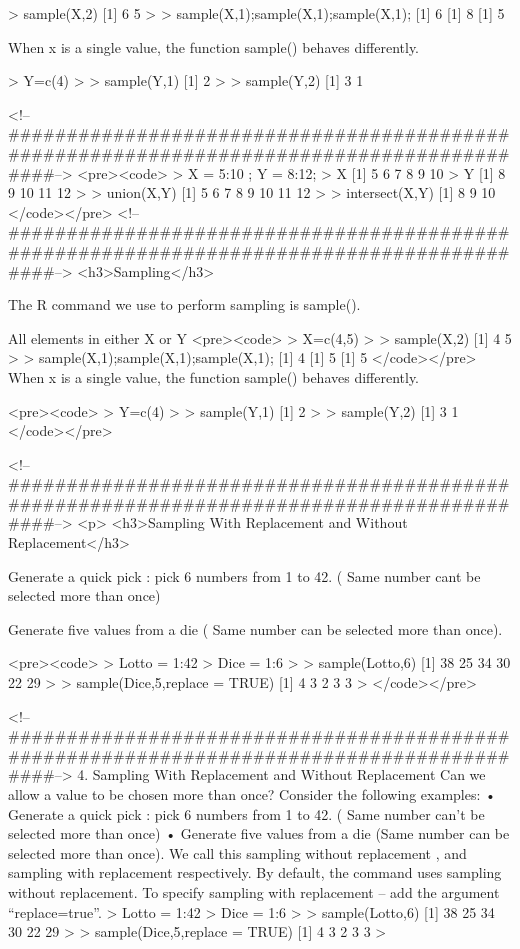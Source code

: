 > sample(X,2)
[1] 6 5
>
> sample(X,1);sample(X,1);sample(X,1);
[1] 6
[1] 8
[1] 5


When x is a single value, the function sample() behaves differently.

> Y=c(4)
>
> sample(Y,1)
[1] 2
> 
> sample(Y,2)
[1] 3 1







<!--##########################################################################################-->
<pre><code>
> X = 5:10 ; Y = 8:12;
> X
[1]  5  6  7  8  9 10
> Y
[1]  8  9 10 11 12
>
> union(X,Y)
[1]  5  6  7  8  9 10 11 12
>
> intersect(X,Y)
[1]  8  9 10
</code></pre>
<!--##########################################################################################-->
<h3>Sampling</h3>

The R command we use to perform sampling is sample().

All elements in either X or Y
<pre><code>
> X=c(4,5)
>
> sample(X,2)
[1] 4 5
>
> sample(X,1);sample(X,1);sample(X,1);
[1] 4
[1] 5
[1] 5
</code></pre>
When x is a single value, the function sample() behaves differently.

<pre><code>
> Y=c(4)
>
> sample(Y,1)
[1] 2
> 
> sample(Y,2)
[1] 3 1
</code></pre>

<!--##########################################################################################-->
<p>
<h3>Sampling With Replacement and Without Replacement</h3>

Generate a quick pick : pick 6 numbers from 1 to 42. ( Same number cant be selected more than once)

Generate five values from a die ( Same number can be selected more than once).

<pre><code>
> Lotto = 1:42
> Dice = 1:6
> 
> sample(Lotto,6)
[1] 38 25 34 30 22 29
> 
> sample(Dice,5,replace = TRUE)
[1] 4 3 2 3 3
>
</code></pre>

<!--##########################################################################################-->
4. Sampling With Replacement and Without Replacement
Can we allow a value to be chosen more than once? Consider the following examples:
•	Generate a quick pick : pick 6 numbers from 1 to 42. ( Same number can’t be selected more than once)
•	Generate five values from a die (Same number can be selected more than once).
We call this sampling without replacement , and sampling with replacement respectively.
By default, the command uses sampling without replacement. To specify sampling with replacement – add the argument “replace=true”.
> Lotto = 1:42
> Dice = 1:6
> 
> sample(Lotto,6)
[1] 38 25 34 30 22 29
> 
> sample(Dice,5,replace = TRUE)
[1] 4 3 2 3 3
>



